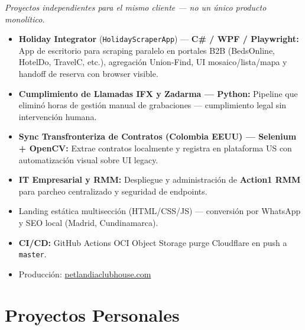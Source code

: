 
\textit{Proyectos independientes para el mismo cliente — no un único producto monolítico.}

\begin{itemize}
  \item \textbf{Holiday Integrator} (\texttt{HolidayScraperApp}) — \textbf{C\# / WPF / Playwright:}
        App de escritorio para scraping paralelo en portales B2B (BedsOnline, HotelDo, TravelC, etc.),
        agregación Union-Find, UI mosaico/lista/mapa y handoff de reserva con browser visible.

  \item \textbf{Cumplimiento de Llamadas IFX y Zadarma — Python:}
        Pipeline que eliminó horas de gestión manual de grabaciones — cumplimiento legal sin intervención humana.

  \item \textbf{Sync Transfronteriza de Contratos (Colombia \textrightarrow{} EEUU) — Selenium + OpenCV:}
        Extrae contratos localmente y registra en plataforma US con automatización visual sobre UI legacy.

  \item \textbf{IT Empresarial y RMM:}
        Despliegue y administración de \textbf{Action1 RMM} para parcheo centralizado y seguridad de endpoints.
\end{itemize}

\vspace{4pt}


\begin{itemize}
  \item Landing estática multisección (HTML/CSS/JS) — conversión por WhatsApp y SEO local (Madrid, Cundinamarca).
  \item \textbf{CI/CD:} GitHub Actions \textrightarrow{} OCI Object Storage \textrightarrow{} purge Cloudflare en push a \texttt{master}.
  \item Producción: \href{https://petlandiaclubhouse.com}{petlandiaclubhouse.com}
\end{itemize}

\section*{Proyectos Personales}

